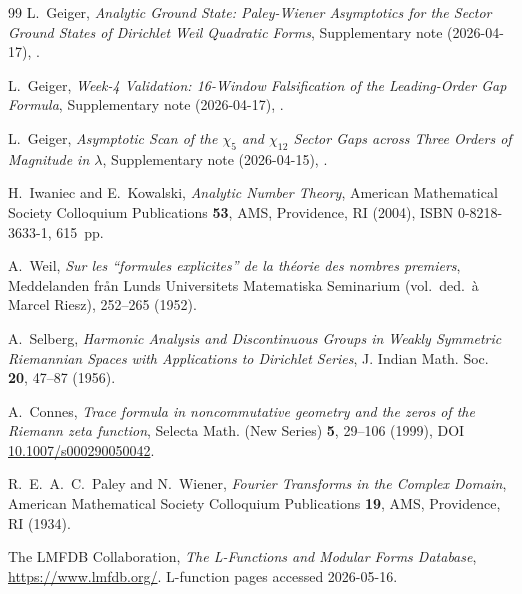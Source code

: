 \documentclass[a4paper,10pt,twocolumn]{article}
\theoremstyle{definition}
\theoremstyle{remark}
\begin{document}
\begin{thebibliography}{99}
L.~Geiger,
\textit{Analytic Ground State: Paley-Wiener Asymptotics for the
Sector Ground States of Dirichlet Weil Quadratic Forms},
Supplementary note (2026-04-17),
.

L.~Geiger,
\textit{Week-4 Validation: 16-Window Falsification of the
Leading-Order Gap Formula},
Supplementary note (2026-04-17),
.

L.~Geiger,
\textit{Asymptotic Scan of the $\chi_5$ and $\chi_{12}$ Sector Gaps
across Three Orders of Magnitude in $\lambda$},
Supplementary note (2026-04-15),
.


H.~Iwaniec and E.~Kowalski,
\textit{Analytic Number Theory},
American Mathematical Society Colloquium Publications \textbf{53},
AMS, Providence, RI (2004), ISBN 0-8218-3633-1, 615~pp.

A.~Weil,
\textit{Sur les ``formules explicites'' de la th\'eorie des nombres
premiers},
Meddelanden fr\aa n Lunds Universitets Matematiska Seminarium
(vol.\ ded.\ \`a Marcel Riesz), 252--265 (1952).

A.~Selberg,
\textit{Harmonic Analysis and Discontinuous Groups in Weakly
Symmetric Riemannian Spaces with Applications to Dirichlet Series},
J. Indian Math. Soc. \textbf{20}, 47--87 (1956).

A.~Connes,
\textit{Trace formula in noncommutative geometry and the zeros of
the Riemann zeta function},
Selecta Math. (New Series) \textbf{5}, 29--106 (1999),
DOI \href{https://doi.org/10.1007/s000290050042}{10.1007/s000290050042}.

R.~E.~A.~C.~Paley and N.~Wiener,
\textit{Fourier Transforms in the Complex Domain},
American Mathematical Society Colloquium Publications \textbf{19},
AMS, Providence, RI (1934).

The LMFDB Collaboration,
\textit{The L-Functions and Modular Forms Database},
\url{https://www.lmfdb.org/}. L-function pages accessed 2026-05-16.

\end{thebibliography}
\end{document}
